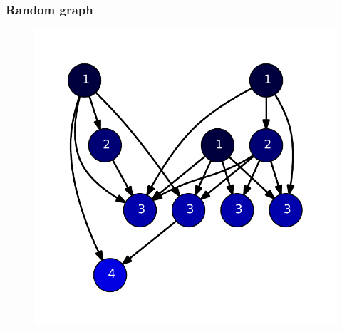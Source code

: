 \begin{frame}
\frametitle{Random graph}
\begin{figure}[!hbp]
    \includegraphics[height=0.7\textheight]{img/random_lin10.pdf}
\end{figure}

\end{frame}

